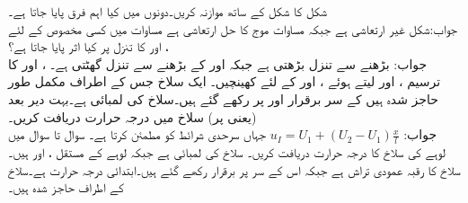 

\quad 
شکل   کا شکل  کے ساتھ موازنہ کریں۔دونوں میں کیا اہم فرق پایا جاتا ہے۔\\
جواب:\quad شکل  غیر ارتعاشی ہے جبکہ مساوات موج کا حل ارتعاشی ہے
 \quad 
مساوات  میں کسی مخصوص  کے لئے ،  اور  کا تنزل پر کیا اثر پایا جاتا ہے؟\\
جواب:\quad {} بڑھنے سے تنزل بڑھتی ہے جبکہ  اور  کے بڑھنے سے تنزل گھٹتی ہے۔
 \quad 
{}،  اور  کا ترسیم  ،  اور  لیتے ہوئے ،  اور  کے لئے کھینچیں۔
\quad
ایک سلاخ جس کے اطراف مکمل طور حاجز شدہ ہیں  کے سر برقرار  اور  پر رکھے گئے ہیں۔سلاخ کی لمبائی  ہے۔بہت دیر بعد (یعنی  پر) سلاخ میں درجہ حرارت  دریافت کریں۔ \\
جواب:\quad
$u_I=U_1+(U_2-U_1)\tfrac{x}{l}$
جہاں  سرحدی شرائط کو مطمئن کرتا ہے۔
سوال  تا سوال  میں لوہے کی سلاخ کا درجہ حرارت  دریافت کریں۔ سلاخ کی لمبائی  ہے جبکہ لوہے کے مستقل ،  اور  ہیں۔ سلاخ کا رقبہ عمودی تراش  ہے جبکہ اس کے سر  پر برقرار رکھے گئے ہیں۔ابتدائی درجہ حرارت  ہے۔سلاخ کے اطراف حاجز شدہ ہیں۔

